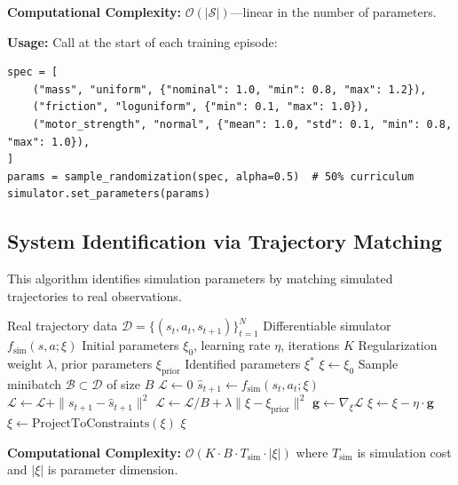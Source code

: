 \textbf{Computational Complexity:} $\mathcal{O}(|\mathcal{S}|)$---linear in the number of parameters.

\textbf{Usage:} Call at the start of each training episode:
\begin{verbatim}
spec = [
    ("mass", "uniform", {"nominal": 1.0, "min": 0.8, "max": 1.2}),
    ("friction", "loguniform", {"min": 0.1, "max": 1.0}),
    ("motor_strength", "normal", {"mean": 1.0, "std": 0.1, "min": 0.8, "max": 1.0}),
]
params = sample_randomization(spec, alpha=0.5)  # 50% curriculum
simulator.set_parameters(params)
\end{verbatim}

\subsection{System Identification via Trajectory Matching}

This algorithm identifies simulation parameters by matching simulated trajectories to real observations.

\begin{algorithm}[H]
\caption{Gradient-Based System Identification}
\label{alg:sysid_gradient}
\begin{algorithmic}[1]
\REQUIRE Real trajectory data $\mathcal{D} = \{(s_t, a_t, s_{t+1})\}_{t=1}^N$
\REQUIRE Differentiable simulator $f_{\text{sim}}(s, a; \xi)$
\REQUIRE Initial parameters $\xi_0$, learning rate $\eta$, iterations $K$
\REQUIRE Regularization weight $\lambda$, prior parameters $\xi_{\text{prior}}$
\ENSURE Identified parameters $\xi^*$
\STATE $\xi \gets \xi_0$
    \STATE Sample minibatch $\mathcal{B} \subset \mathcal{D}$ of size $B$
    \STATE $\mathcal{L} \gets 0$
        \STATE $\hat{s}_{t+1} \gets f_{\text{sim}}(s_t, a_t; \xi)$
        \STATE $\mathcal{L} \gets \mathcal{L} + \|s_{t+1} - \hat{s}_{t+1}\|^2$
    \ENDFOR
    \STATE $\mathcal{L} \gets \mathcal{L} / B + \lambda \|\xi - \xi_{\text{prior}}\|^2$ 
    \STATE $\mathbf{g} \gets \nabla_\xi \mathcal{L}$ 
    \STATE $\xi \gets \xi - \eta \cdot \mathbf{g}$ 
    \STATE $\xi \gets \text{ProjectToConstraints}(\xi)$ 
\ENDFOR
\RETURN $\xi$
\end{algorithmic}
\end{algorithm}

\textbf{Computational Complexity:} $\mathcal{O}(K \cdot B \cdot T_{\text{sim}} \cdot |\xi|)$ where $T_{\text{sim}}$ is simulation cost and $|\xi|$ is parameter dimension.

